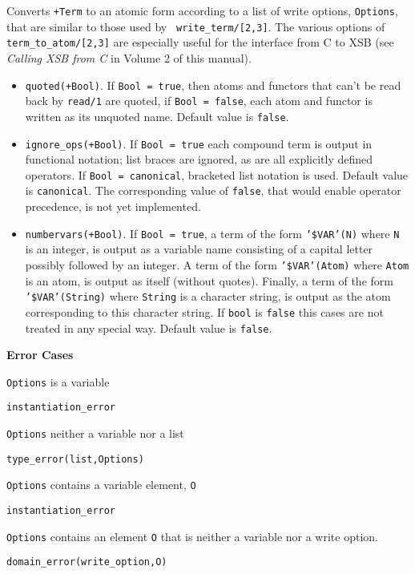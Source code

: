 \begin{description}
%
Converts {\tt +Term} to an atomic form according to a list of write
options, {\tt Options}, that are similar to those used by {\tt
write\_term/[2,3]}.  The various options of {\tt
term\_to\_atom/[2,3]} are especially useful for the interface from C
to XSB (see {\em Calling XSB from C} in Volume 2 of this manual).
%
\begin{itemize}
%
\item {\tt quoted(+Bool)}.  If {\tt Bool = true}, then atoms and
    functors that can't be read back by {\tt read/1} are quoted, if
    {\tt Bool = false}, each atom and functor is written as its
    unquoted name. Default value is {\tt false}.
%
\item {\tt ignore\_ops(+Bool)}. If {\tt Bool = true} each compound term
is output in functional notation; list braces are ignored, as are all
explicitly defined operators.  If {\tt Bool = canonical}, bracketed list
notation is used.  Default value is {\tt canonical}.  The
corresponding value of {\tt false}, that would enable operator
precedence, is not yet implemented.
%
 \item {\tt numbervars(+Bool)}.  If {\tt Bool = true}, a term of the
form {\tt '\$VAR'(N)} where {\tt N} is an integer, is output as a
variable name consisting of a capital letter possibly followed by an
integer.  A term of the form {\tt '\$VAR'(Atom)} where {\tt Atom} is an
atom, is output as itself (without quotes).  Finally, a term of the
form {\tt '\$VAR'(String)} where {\tt String} is a character string, is
output as the atom corresponding to this character string.  If
{\tt bool} is {\tt false} this cases are not treated in any special
way.  Default value is {\tt false}.
%
\end{itemize}

{\bf Error Cases} 
\bi
\item 	{\tt Options} is a variable
\bi
\item    {\tt instantiation\_error}
\ei
\item 	{\tt Options} neither a variable nor a list
\bi
\item    {\tt type\_error(list,Options)}
\ei
\item 	{\tt Options} contains a variable element, {\tt O}
\bi
\item    {\tt instantiation\_error}
\ei
\item 	{\tt Options} contains an element {\tt O} that is neither a variable
nor a write option.
\bi
\item    {\tt domain\_error(write\_option,O)}
\ei
\ei


\end{description}
